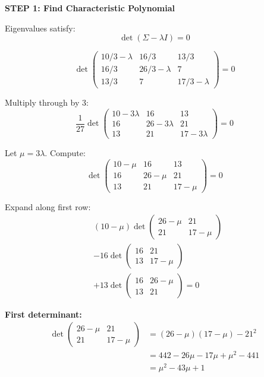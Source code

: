 \documentclass[12pt]{article}
\begin{document}
\begin{solution}

\textbf{STEP 1: Find Characteristic Polynomial}

Eigenvalues satisfy:
\[
\det(\Sigma - \lambda I) = 0
\]

\[
\det\begin{pmatrix}
10/3 - \lambda & 16/3 & 13/3 \\
16/3 & 26/3 - \lambda & 7 \\
13/3 & 7 & 17/3 - \lambda
\end{pmatrix} = 0
\]

Multiply through by 3:
\[
\frac{1}{27}\det\begin{pmatrix}
10 - 3\lambda & 16 & 13 \\
16 & 26 - 3\lambda & 21 \\
13 & 21 & 17 - 3\lambda
\end{pmatrix} = 0
\]

Let $\mu = 3\lambda$. Compute:
\[
\det\begin{pmatrix}
10 - \mu & 16 & 13 \\
16 & 26 - \mu & 21 \\
13 & 21 & 17 - \mu
\end{pmatrix} = 0
\]

Expand along first row:
\begin{align*}
&(10-\mu)\det\begin{pmatrix}26-\mu & 21 \\ 21 & 17-\mu\end{pmatrix} \\
&- 16\det\begin{pmatrix}16 & 21 \\ 13 & 17-\mu\end{pmatrix} \\
&+ 13\det\begin{pmatrix}16 & 26-\mu \\ 13 & 21\end{pmatrix} = 0
\end{align*}

\textbf{First determinant:}
\begin{align*}
\det\begin{pmatrix}26-\mu & 21 \\ 21 & 17-\mu\end{pmatrix} &= (26-\mu)(17-\mu) - 21^2 \\
&= 442 - 26\mu - 17\mu + \mu^2 - 441 \\
&= \mu^2 - 43\mu + 1
\end{align*}


\end{solution}
\end{document}
